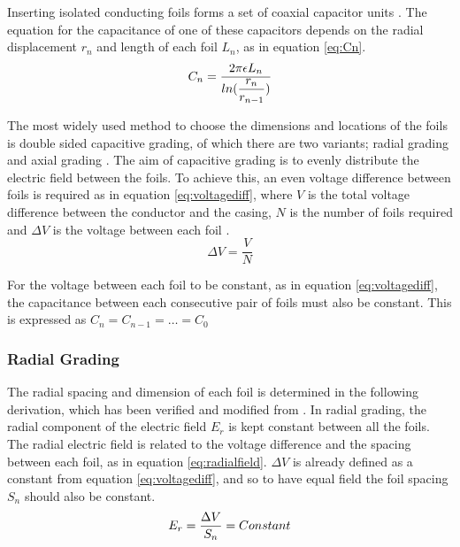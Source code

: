 Inserting isolated conducting foils forms a set of coaxial capacitor units \cite{kuffel2000high}.
The equation for the capacitance of one of these capacitors depends on the radial displacement $r_n$ and length of each foil $L_n$, as in equation \ref{eq:Cn}.
\begin{equation}
   \label{eq:Cn}
   C_n =\displaystyle\displaystyle\frac{2\pi\epsilon L_{n}}{ln(\displaystyle\frac{r_{n}}{r_{n-1}})}
\end{equation}

The most widely used method to choose the dimensions and locations of the foils is double sided capacitive grading, of which there are two variants; radial grading and axial grading \cite{Ahmed11}.
The aim of capacitive grading is to evenly distribute the electric field between the foils.
To achieve this, an even voltage difference between foils is required as in equation \ref{eq:voltagediff}, where $V$ is the total voltage difference between the conductor and the casing, $N$ is the number of foils required and $\Delta V$ is the voltage between each foil \cite{David1}.
\begin{equation}
   \label{eq:voltagediff}
   \Delta V = \displaystyle\frac{V}{N}
\end{equation}

For the voltage between each foil to be constant, as in equation \ref{eq:voltagediff}, the capacitance between each consecutive pair of foils must also be constant. This is expressed as $C_n = C_{n-1} = \dots = C_0$

\subsubsection{Radial Grading} \label{Section:RadialGrading}
The radial spacing and dimension of each foil is determined in the following derivation, which has been verified and modified from \cite{kuffel2000high}.
In radial grading, the radial component of the electric field $E_r$ is kept constant between all the foils.
The radial electric field is related to the voltage difference and the spacing between each foil, as in equation \ref{eq:radialfield}. $\Delta V$ is already defined as a constant from equation \ref{eq:voltagediff}, and so to have equal field the foil spacing $S_n$ should also be constant. 
\begin{equation}
   \label{eq:radialfield}
   E_r = \displaystyle\displaystyle\frac{\Delta V}{S_n} = Constant
\end{equation}

